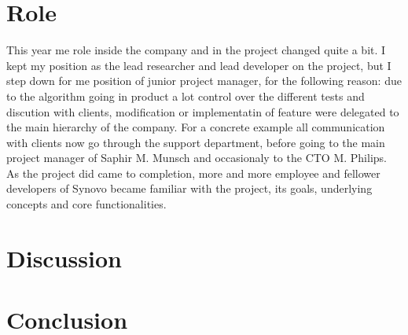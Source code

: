 \documentclass[12pt]{memoir}
\begin{document}
\section{Role}

This year me role inside the company and in the project changed quite a bit. I kept
my position as the lead researcher and lead developer on the project, but I step
down for me position of junior project manager, for the following reason: due to the
algorithm going in product a lot control over the different tests and discution with
clients, modification or implementatin of feature were delegated to the main
hierarchy of the company. For a concrete example all communication with clients now
go through the support department, before going to the main project manager of
Saphir M. Munsch and occasionaly to the CTO M. Philips.\\
As the project did came to completion, more and more employee and fellower
developers of Synovo became familiar with the project, its goals, underlying
concepts and core functionalities.

\section{Discussion}

\section{Conclusion}



\end{document}
